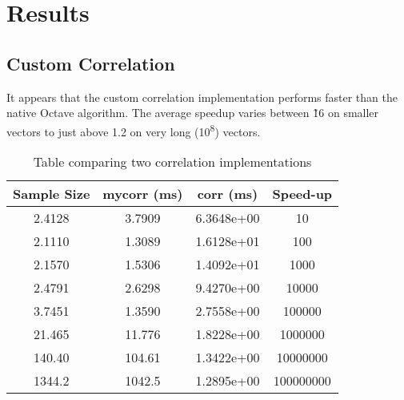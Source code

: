 \section{Results}

\subsection{Custom Correlation}
It appears that the custom correlation implementation performs faster than the native Octave algorithm. The average speedup varies between \~16 on smaller vectors to just above 1.2 on very long (10\textsuperscript{8}) vectors.


\begin{table}[h]
\centering
\begin{tabular}{|c|c|c|c|}
\hline
\textbf{Sample Size} & \textbf{mycorr (ms)} & \textbf{corr (ms)} & \textbf{Speed-up} \\
\hline

2.4128 &  3.7909 &  6.3648e+00 &  10 \\ \hline
2.1110 &  1.3089 &  1.6128e+01 &  100 \\ \hline
2.1570 &  1.5306 &  1.4092e+01 &  1000 \\ \hline
2.4791 &  2.6298 &  9.4270e+00 &  10000 \\ \hline
3.7451 &  1.3590 &  2.7558e+00 &  100000 \\ \hline
21.465 &  11.776 &  1.8228e+00 &  1000000 \\ \hline
140.40 &  104.61 &  1.3422e+00 &  10000000 \\ \hline
1344.2 &  1042.5 &  1.2895e+00 &  100000000 \\ \hline



\end{tabular}
\caption{Table comparing two correlation implementations}
\label{tab:comparison}
\end{table}


